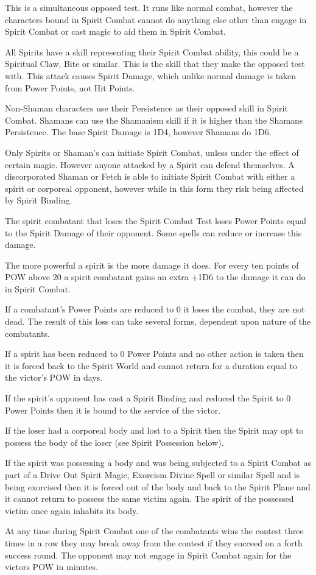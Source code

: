 \begin{rpg-list}
\item This is a simultaneous opposed test. It runs like normal combat, however the characters bound in Spirit Combat cannot do anything else other than engage in Spirit Combat or cast magic to aid them in Spirit Combat. 
\item All Spirits have a skill representing their Spirit Combat ability, this could be a Spiritual Claw, Bite or similar. This is the skill that they make the opposed test with. This attack causes Spirit Damage, which unlike normal damage is taken from Power Points, not Hit Points.
\item Non-Shaman characters use their Persistence as their opposed skill in Spirit Combat. Shamans can use the Shamanism skill if it is higher than the Shamans Persistence. The base Spirit Damage is 1D4, however Shamans do 1D6.
\item Only Spirits or Shaman’s can initiate Spirit Combat, unless under the effect of certain magic. However anyone attacked by a Spirit can defend themselves. A discorporated Shaman or Fetch is able to initiate Spirit Combat with either a spirit or corporeal opponent, however while in this form they risk being affected by Spirit Binding.
\item The spirit combatant that loses the Spirit Combat Test loses Power Points equal to the Spirit Damage of their opponent. Some spells can reduce or increase this damage.
\item The more powerful a spirit is the more damage it does. For every ten points of POW above 20 a spirit combatant gains an extra +1D6 to the damage it can do in Spirit Combat.
\item If a combatant’s Power Points are reduced to 0 it loses the combat, they are not dead. The result of this loss can take several forms, dependent upon nature of the combatants.
\item If a spirit has been reduced to 0 Power Points and no other action is taken then it is forced back to the Spirit World and cannot return for a duration equal to the victor’s POW in days.
\item If the spirit’s opponent has cast a Spirit Binding and reduced the Spirit to 0 Power Points then it is bound to the service of the victor. 
\item If the loser had a corporeal body and lost to a Spirit then the Spirit may opt to possess the body of the loser (see Spirit Possession below).
\item If the spirit was possessing a body and was being subjected to a Spirit Combat as part of a Drive Out Spirit Magic, Exorcism Divine Spell or similar Spell and is being exorcised then it is forced out of the body and back to the Spirit Plane and it cannot return to possess the same victim again. The spirit of the possessed victim once again inhabits its body.
\item At any time during Spirit Combat one of the combatants wins the contest three times in a row they may break away from the contest if they succeed on a forth success round. The opponent may not engage in Spirit Combat again for the victors POW in minutes.
\end{rpg-list}


